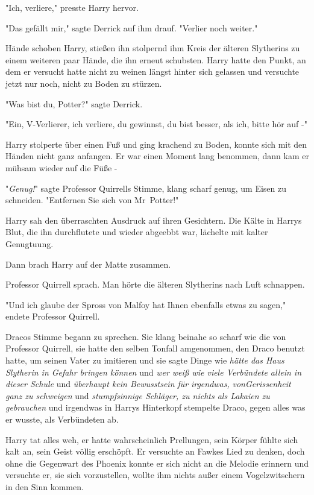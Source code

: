 {"Ich, verliere," presste Harry hervor.

"Das gefällt mir," sagte Derrick auf ihm drauf. "Verlier noch weiter."

\later

Hände schoben Harry, stießen ihn stolpernd ihm Kreis der älteren Slytherins zu einem weiteren paar Hände, die ihn erneut schubsten. Harry hatte den Punkt, an dem er versucht hatte nicht zu weinen längst hinter sich gelassen und versuchte jetzt nur noch, nicht zu Boden zu stürzen.

"Was bist du, Potter?" sagte Derrick.

"Ein, V-Verlierer, ich verliere, du gewinnst, du bist besser, als ich, bitte hör auf -"

Harry stolperte über einen Fuß und ging krachend zu Boden, konnte sich mit den Händen nicht ganz anfangen. Er war einen Moment lang benommen, dann kam er mühsam wieder auf die Füße -

"\emph{Genug!}" sagte Professor Quirrells Stimme, klang scharf genug, um Eisen zu schneiden. "Entfernen Sie sich von Mr~Potter!"

Harry sah den überraschten Ausdruck auf ihren Gesichtern. Die Kälte in Harrys Blut, die ihn durchflutete und wieder abgeebbt war, lächelte mit kalter Genugtuung.

Dann brach Harry auf der Matte zusammen.

Professor Quirrell sprach. Man hörte die älteren Slytherins nach Luft schnappen.

"Und ich glaube der Spross von Malfoy hat Ihnen ebenfalls etwas zu sagen," endete Professor Quirrell.

Dracos Stimme begann zu sprechen. Sie klang beinahe so scharf wie die von Professor Quirrell, sie hatte den selben Tonfall amgenommen, den Draco benutzt hatte, um seinen Vater zu imitieren und sie sagte Dinge wie \emph{hätte das Haus Slytherin in Gefahr bringen können} und \emph{wer weiß wie viele Verbündete allein in dieser Schule} und \emph{überhaupt kein Bewusstsein für} \emph{irgendwas,} \emph{vonGerissenheit ganz zu schweigen} und \emph{stumpfsinnige Schläger, zu nichts als Lakaien zu gebrauchen} und irgendwas in Harrys Hinterkopf stempelte Draco, gegen alles was er wusste, als Verbündeten ab.

Harry tat alles weh, er hatte wahrscheinlich Prellungen, sein Körper fühlte sich kalt an, sein Geist völlig erschöpft. Er versuchte an Fawkes Lied zu denken, doch ohne die Gegenwart des Phoenix konnte er sich nicht an die Melodie erinnern und versuchte er, sie sich vorzustellen, wollte ihm nichts außer einem Vogelzwitschern in den Sinn kommen.

}
